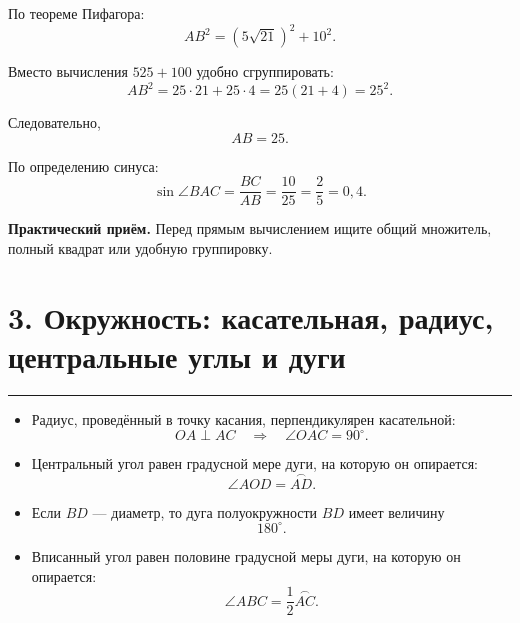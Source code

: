 \documentclass[a4paper,12pt]{article}
\newcommand{\sectionrule}{
  \par
  \vspace{0.2em}
  \noindent
  \textcolor{accent}{\rule{\linewidth}{0.7pt}}
  \vspace{0.35em}
}
\newcommand{\key}[1]{\textbf{\textcolor{darkaccent}{#1}}}
\begin{document}
\begin{center}
\end{center}

По теореме Пифагора:
\[
AB^2=(5\sqrt{21})^2+10^2.
\]

Вместо вычисления \(525+100\) удобно сгруппировать:
\[
AB^2
=
25\cdot21+25\cdot4
=
25(21+4)
=
25^2.
\]

Следовательно,
\[
AB=25.
\]

По определению синуса:
\[
\sin\angle BAC
=
\frac{BC}{AB}
=
\frac{10}{25}
=
\frac25
=
0{,}4.
\]

\key{Практический приём.}
Перед прямым вычислением ищите общий множитель,
полный квадрат или удобную группировку.

\section*{3. Окружность: касательная, радиус, центральные углы и дуги}
\sectionrule

\begin{itemize}

  \item Радиус, проведённый в точку касания,
  перпендикулярен касательной:
  \[
  OA\perp AC
  \quad\Rightarrow\quad
  \angle OAC=90^\circ.
  \]

  \item Центральный угол равен градусной мере дуги,
  на которую он опирается:
  \[
  \angle AOD=\overset{\frown}{AD}.
  \]

  \item Если \(BD\) --- диаметр, то дуга полуокружности \(BD\)
  имеет величину
  \[
  180^\circ.
  \]

  \item Вписанный угол равен половине градусной меры дуги,
  на которую он опирается:
  \[
  \angle ABC
  =
  \frac12\overset{\frown}{AC}.
  \]

\end{itemize}
\end{document}

